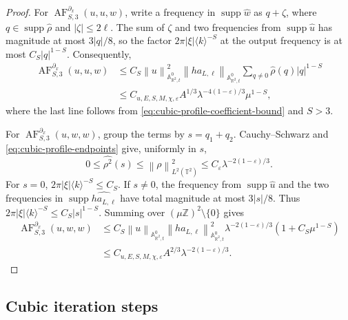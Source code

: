 \documentclass[12pt,reqno,letterpaper]{amsart}
\numberwithin{equation}{section}
\theoremstyle{definition}
\newcommand{\T}{\mathbb T}
\newcommand{\R}{\mathbb R}
\newcommand{\Z}{\mathbb Z}
\newcommand{\A}{\mathbb A}
\newcommand{\eps}{\varepsilon}
\newcommand{\la}{\lambda}
\newcommand{\supp}{\operatorname{supp}}
\newcommand{\norm}[1]{\left\lVert #1\right\rVert}
\newcommand{\abs}[1]{\left\lvert #1\right\rvert}
\begin{document}
\begin{proof}
For $\operatorname{AF}^{\partial_x}_{S,3}(u,u,w)$, write a frequency in
$\supp\widehat w$ as $q+\zeta$, where
$q\in\supp\widehat\rho$ and
$\abs\zeta\leq2\ell$.  The sum of $\zeta$ and two frequencies from
$\supp\widehat u$ has magnitude at most $3\abs q/8$, so the factor
$2\pi\abs\xi\langle k\rangle^{-S}$ at the output frequency is at most
$C_S\abs q^{1-S}$.  Consequently,
\begin{align*}
 \operatorname{AF}^{\partial_x}_{S,3}(u,u,w)
 &\leq C_S\norm u_{\A^0_{\R^2,t}}^2
       \norm{h a_{L,\ell}}_{\A^0_{\R^2,t}}
       \sum_{q\neq0}\widehat\rho(q)\abs q^{1-S}\\
 &\leq C_{u,E,S,M,\chi,\eps}A^{1/3}
       \la^{-4(1-\eps)/3}\mu^{1-S},
\end{align*}
where the last line follows from
\eqref{eq:cubic-profile-coefficient-bound} and $S>3$.

For $\operatorname{AF}^{\partial_x}_{S,3}(u,w,w)$, group the terms by
$s=q_1+q_2$.  Cauchy--Schwarz and
\eqref{eq:cubic-profile-endpoints} give, uniformly in $s$,
\begin{equation*}
 0\leq\widehat{\rho^2}(s)
 \leq\norm{\rho}_{L^2(\T^2)}^2
 \leq C_\eps\la^{-2(1-\eps)/3}.
\end{equation*}
For $s=0$, $2\pi\abs\xi\langle k\rangle^{-S}\leq C_S$.  If $s\neq0$,
the frequency from $\supp\widehat u$ and the two frequencies in
$\supp\widehat{h a_{L,\ell}}$ have total magnitude at most
$3\abs s/8$.  Thus
$2\pi\abs\xi\langle k\rangle^{-S}\leq C_S\abs s^{1-S}$.
Summing over $(\mu\Z)^2\setminus\{0\}$ gives
\begin{align*}
 \operatorname{AF}^{\partial_x}_{S,3}(u,w,w)
 &\leq C_S\norm u_{\A^0_{\R^2,t}}
       \norm{h a_{L,\ell}}_{\A^0_{\R^2,t}}^2
       \la^{-2(1-\eps)/3}(1+C_S\mu^{1-S})\\
 &\leq C_{u,E,S,M,\chi,\eps}A^{2/3}
       \la^{-2(1-\eps)/3}.
\end{align*}
\end{proof}

\subsection{Cubic iteration steps}
\end{document}
